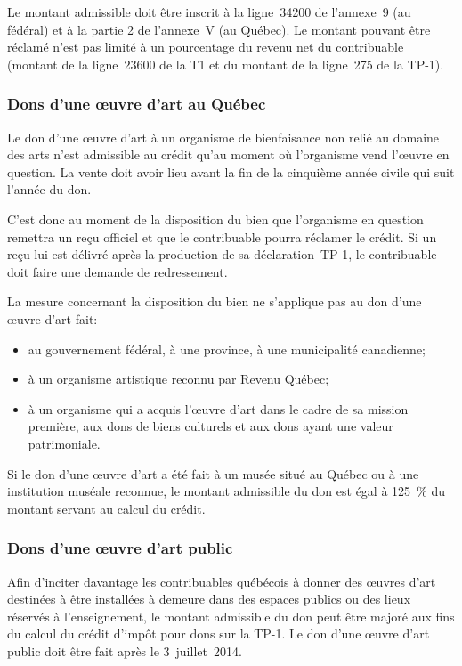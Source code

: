 Le montant admissible doit être inscrit à la ligne~34200 de l'annexe~9 (au fédéral) et à la partie 2 de l'annexe~V (au Québec). Le montant pouvant être réclamé n'est pas limité à un pourcentage du revenu net du contribuable (montant de la ligne~23600 de la T1 et du montant de la ligne~275 de la TP-1). 

\subsubsection{Dons d'une œuvre d'art au Québec}
Le don d'une œuvre d'art à un organisme de bienfaisance non relié au domaine des arts n'est admissible au crédit qu'au moment où l'organisme vend l'œuvre en question. La vente doit avoir lieu avant la fin de la cinquième année civile qui suit l'année du don.

C'est donc au moment de la disposition du bien que l'organisme en question remettra un reçu officiel et que le contribuable pourra réclamer le crédit. Si un reçu lui est délivré après la production de sa déclaration~TP-1, le contribuable doit faire une demande de redressement.

La mesure concernant la disposition du bien ne s'applique pas au don d'une œuvre d'art fait:
\begin{itemize}[label=]
	\item au gouvernement fédéral, à une province, à une municipalité canadienne;
	\item à un organisme artistique reconnu par Revenu Québec;
	\item à un organisme qui a acquis l'œuvre d'art dans le cadre de sa mission première, aux dons de biens culturels et aux dons ayant une valeur patrimoniale.
\end{itemize}

Si le don d'une œuvre d'art a été fait à un musée situé au Québec ou à une institution muséale reconnue, le montant admissible du don est égal à 125~\% du montant servant au calcul du crédit.

\subsubsection{Dons d'une œuvre d'art public}
Afin d'inciter davantage les contribuables québécois à donner des œuvres d'art destinées à être installées à demeure dans des espaces publics ou des lieux réservés à l'enseignement, le montant admissible du don peut être majoré aux fins du calcul du crédit d'impôt pour dons sur la TP-1. Le don d'une œuvre d'art public doit être fait après le 3~juillet~2014.

